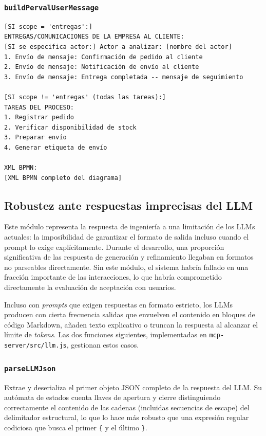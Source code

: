 \subsubsection{\texttt{buildPervalUserMessage}}

\begin{lstlisting}[style=promptbox]
[SI scope = 'entregas':]
ENTREGAS/COMUNICACIONES DE LA EMPRESA AL CLIENTE:
[SI se especifica actor:] Actor a analizar: [nombre del actor]
1. Envío de mensaje: Confirmación de pedido al cliente
2. Envío de mensaje: Notificación de envío al cliente
3. Envío de mensaje: Entrega completada -- mensaje de seguimiento

[SI scope != 'entregas' (todas las tareas):]
TAREAS DEL PROCESO:
1. Registrar pedido
2. Verificar disponibilidad de stock
3. Preparar envío
4. Generar etiqueta de envío

XML BPMN:
[XML BPMN completo del diagrama]
\end{lstlisting}

\subsection{Robustez ante respuestas imprecisas del LLM}
\label{subsec:robustez}

Este módulo representa la respuesta de ingeniería a una limitación de los LLMs actuales: la imposibilidad de garantizar el formato de salida incluso cuando el prompt lo exige explícitamente. Durante el desarrollo, una proporción significativa de las respuesta de generación y refinamiento llegaban en formatos no parseables directamente. Sin este módulo, el sistema habría fallado en una fracción importante de las interacciones, lo que habría comprometido directamente la evaluación de aceptación con usuarios. 

Incluso con \textit{prompts} que exigen respuestas en formato estricto, los LLMs producen con cierta frecuencia salidas que envuelven el contenido en bloques de código Markdown, añaden texto explicativo o truncan la respuesta al alcanzar el límite de \textit{tokens}. Las dos funciones siguientes, implementadas en \texttt{mcp-server/src/llm.js}, gestionan estos casos.

\subsubsection{\texttt{parseLLMJson}}

Extrae y deserializa el primer objeto JSON completo de la respuesta del LLM. Su autómata de estados cuenta llaves de apertura y cierre distinguiendo correctamente el contenido de las cadenas (incluidas secuencias de escape) del delimitador estructural, lo que lo hace más robusto que una expresión regular codiciosa que busca el primer \texttt{\{} y el último \texttt{\}}.

